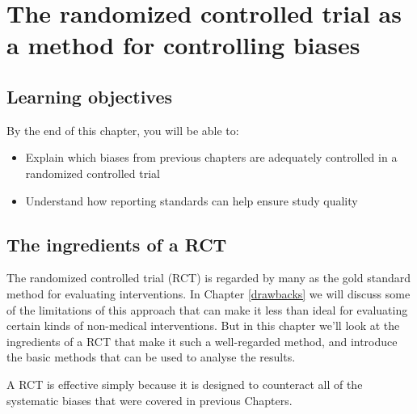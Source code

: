 \documentclass{krantz}
\begin{document}
\hypertarget{RCT}{%
\chapter{The randomized controlled trial as a method for controlling biases}\label{RCT}}

\hypertarget{learning-objective-s}{%
\section{Learning objectives}\label{learning-objective-s}}

By the end of this chapter, you will be able to:
\begin{itemize}
\item
 Explain which biases from previous chapters are adequately controlled in a randomized controlled trial\\
\item
 Understand how reporting standards can help ensure study quality
 \end{itemize}

\hypertarget{the-ingredients-of-a-rct}{%
\section{The ingredients of a RCT}\label{the-ingredients-of-a-rct}}

The randomized controlled trial (RCT) is regarded by many as the gold standard method for evaluating interventions. In Chapter \ref{drawbacks} we will discuss some of the limitations of this approach that can make it less than ideal for evaluating certain kinds of non-medical interventions. But in this chapter we'll look at the ingredients of a RCT that make it such a well-regarded method, and introduce the basic methods that can be used to analyse the results.

A RCT is effective simply because it is designed to counteract all of the systematic biases that were covered in previous Chapters.
\end{document}
